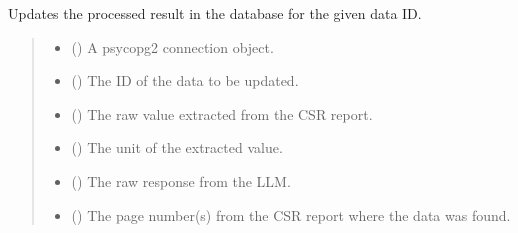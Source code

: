 \documentclass[letterpaper,10pt,english]{sphinxmanual}
\begin{document}
\begin{fulllineitems}
\label{\detokenize{modules.data_storage:modules.data_storage.llm_analyse.update_result}}
\pysigstartsignatures
\pysiglinewithargsret
{}
{\sphinxparamcomma {}\sphinxparamcomma {}\sphinxparamcomma {}\sphinxparamcomma {}\sphinxparamcomma {}}
{}
\pysigstopsignatures
\sphinxAtStartPar
Updates the processed result in the database for the given data ID.
\begin{quote}\begin{description}
\begin{itemize}
\item {} 
\sphinxAtStartPar
{} () \textendash{} A psycopg2 connection object.

\item {} 
\sphinxAtStartPar
{} () \textendash{} The ID of the data to be updated.

\item {} 
\sphinxAtStartPar
{} () \textendash{} The raw value extracted from the CSR report.

\item {} 
\sphinxAtStartPar
{} () \textendash{} The unit of the extracted value.

\item {} 
\sphinxAtStartPar
{} () \textendash{} The raw response from the LLM.

\item {} 
\sphinxAtStartPar
{} () \textendash{} The page number(s) from the CSR report where the data was found.

\end{itemize}

\end{description}\end{quote}

\end{fulllineitems}
\end{document}
